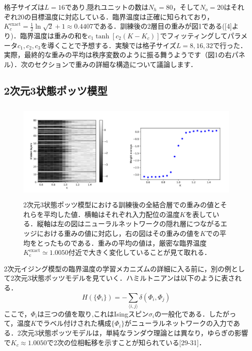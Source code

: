 \documentclass[a4paper,11pt]{jsarticle}
\begin{document}
格子サイズは$L = 16$であり,隠れユニットの数は$N_h = 80$，そして$N_o = 20$はそれぞれ20の目標温度に対応している．臨界温度は正確に知られており，$K_c^{\text{exact}} = \frac{1}{2}\ln{\sqrt{2}+1} \approx 0.4407$である．訓練後の2層目の重みが図1である([4]より)．臨界温度は重みの和を$c_1 \tanh{[c_2(K-K_c)]}$でフィッティングしてパラメータ$c_1,c_2,c_3$を導くことで予想する．実験では格子サイズ$L=8,16,32$で行った．実際，最終的な重みの平均は秩序変数のように振る舞うようです（図1の右パネル）．次のセクションで重みの詳細な構造について議論します．


\subsection{2次元3状態ポッツ模型}
\begin{figure}[hb]
  \begin{center}
    \includegraphics[height=5cm]{image/Figure2.png}
    \caption{2次元3状態ポッツ模型における訓練後の全結合層での重みの値とそれらを平均した値．横軸はそれぞれ入力配位の温度$K$を表している．縦軸は左の図はニューラルネットワークの隠れ層につながるエッジにおける重みの値に対応し，右の図はその重みの値を$K$での平均をとったものである．重みの平均の値は，厳密な臨界温度$K_{\text{c}}^{\text{exact}}\simeq 1.0050$付近で大きく変化していることが見て取れる．}
  \end{center}
\end{figure}
2次元イジング模型の臨界温度の学習メカニズムの詳細に入る前に，別の例として2次元3状態ポッツモデルを見ていく．ハミルトニアンは以下のように表される．
\begin{equation}
  H(\{\Phi_i\}) = - \sum_{\langle i,j \rangle} \delta(\Phi_i, \Phi_j)
\end{equation}
ここで，$\Phi_i$は三つの値を取り,これはIsingスピン$\sigma_i$の一般化である．したがって，温度$K$でラベル付けされた構成$\{ \Phi_i \}$がニューラルネットワークの入力である．2次元3状態ポッツモデルは，単純なランダウ理論とは異なり，ゆらぎの影響で$K_c \approx 1.0050$で2次の位相転移を示すことが知られている[29-31]．
\end{document}
